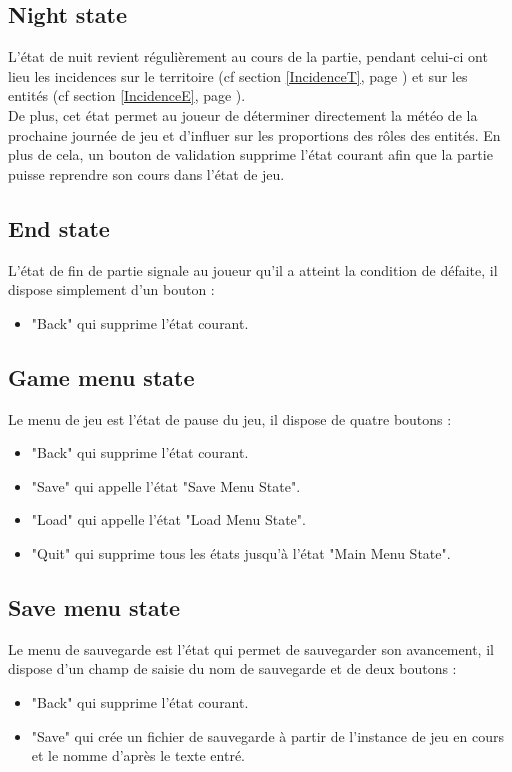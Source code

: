 \documentclass[a4paper]{memoir}
\begin{document}
			\subsection{Night state}
				L’état de nuit revient régulièrement au cours de la partie, pendant celui-ci ont lieu les incidences sur le territoire (cf section \ref{IncidenceT}, page \pageref{IncidenceT}) et sur les entités (cf section \ref{IncidenceE}, page \pageref{IncidenceE}).\\
				De plus, cet état permet au joueur de déterminer directement la météo de la prochaine journée de jeu et d’influer sur les proportions des rôles des entités. En plus de cela, un bouton de validation supprime l’état courant afin que la partie puisse reprendre son cours dans l’état de jeu.
				
			\subsection{End state}
				L’état de fin de partie signale au joueur qu’il a atteint la condition de défaite, il dispose simplement d’un bouton :
				\begin{itemize}[label=$\bullet$]
					\item "Back" qui supprime l’état courant.
				\end{itemize}
				
			\subsection{Game menu state}
				Le menu de jeu est l’état de pause du jeu, il dispose de quatre boutons :
				\begin{itemize}[label=$\bullet$]
					\item "Back" qui supprime l’état courant.
					\item "Save" qui appelle l’état "Save Menu State".
					\item "Load" qui appelle l’état "Load Menu State".
					\item "Quit" qui supprime tous les états jusqu’à l’état "Main Menu State".
				\end{itemize}
				
			\subsection{Save menu state}
				Le menu de sauvegarde est l’état qui permet de sauvegarder son avancement, il dispose d’un champ de saisie du nom de sauvegarde et de deux boutons :
				\begin{itemize}[label=$\bullet$]
					\item "Back" qui supprime l’état courant.
					\item "Save" qui crée un fichier de sauvegarde à partir de l’instance de jeu en cours et le nomme d’après le texte entré.
				\end{itemize}
				
\end{document}
